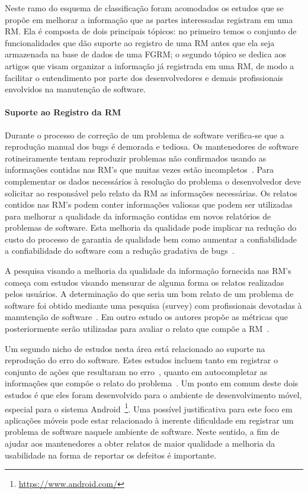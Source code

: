 Neste ramo do esquema de classificação foram acomodados os estudos que se propõe
em melhorar a informação que as partes interessadas registram em uma RM\@. Ela é
composta de dois principais tópicos: no primeiro temos o conjunto de
funcionalidades que dão suporte ao registro de uma RM antes que ela seja
armazenada na base de dados de uma FGRM\@; o segundo tópico se dedica aos
artigos que visam organizar a informação já registrada em uma RM, de modo a
facilitar o entendimento por parte dos desenvolvedores e demais profissionais
envolvidos na manutenção de software.

\paragraph{Suporte ao Registro da RM}

Durante o processo de correção de um problema de software verifica-se que a
reprodução manual dos bugs é demorada e tediosa. Os mantenedores de software
rotineiramente tentam reproduzir problemas não confirmados usando as informações
contidas nas RM's que muitas vezes estão
incompletos~\cite{White:2015:GRR:2820282.2820291}. Para complementar os dados
necessários à resolução do problema o desenvolvedor deve solicitar ao
responsável pelo relato da RM as informações necessárias. Os relatos contidos
nas RM's podem conter informações valiosas que podem ser utilizadas para
melhorar a qualidade da informação contidas em novos relatórios de problemas de
software. Esta melhoria da qualidade pode implicar na redução do custo do
processo de garantia de qualidade bem como aumentar a confiabilidade a
confiabilidade do software com a redução gradativa de
bugs~\cite{Tu:2014:MQI:2677832.2677844}.

A pesquisa visando a melhoria da qualidade da informação fornecida nas RM's
começa com estudos visando mensurar de alguma forma os relatos realizadas pelos
usuários. A determinação do que seria um bom relato de um problema de software
foi obtido mediante uma pesquisa (survey) com profissionais devotadas à
manutenção de software~\cite{Bettenburg2008a}. Em outro estudo os autores propõe
as métricas que posteriormente serão utilizadas para avaliar o relato que compõe
a RM~\cite{Tu:2014:MQI:2677832.2677844}.

Um segundo nicho de estudos  nesta área está relacionado ao suporte na
reprodução do erro do software. Estes estudos incluem tanto em registrar o
conjunto de ações que resultaram no erro~\cite{White:2015:GRR:2820282.2820291},
quanto em autocompletar as informações que compõe o relato do
problema~\cite{moran2015auto}. Um ponto em comum deste dois estudos é que eles
foram desenvolvido para o ambiente de desenvolvimento móvel, especial para o
sistema Android~\footnote{\url{https://www.android.com/}}. Uma possível
justificativa para este foco em aplicações móveis pode estar relacionado à
inerente dificuldade em registrar um problema de software naquele ambiente de
software. Neste sentido, a fim de ajudar aos mantenedores a obter relatos de
maior qualidade a melhoria da usabilidade na forma de reportar os defeitos é
importante.

